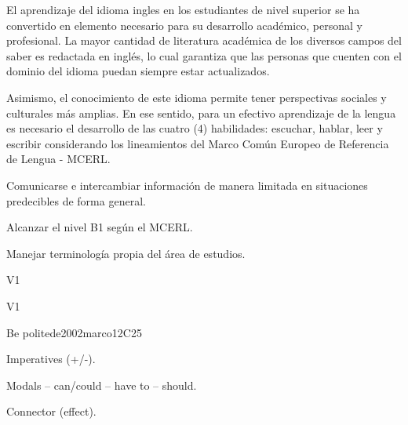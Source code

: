 \begin{syllabus}


\begin{justification}
El aprendizaje del idioma ingles en los estudiantes de nivel superior se ha 
convertido en elemento necesario para su desarrollo académico, 
personal y profesional. La mayor cantidad de literatura académica de los 
diversos campos del saber es redactada en inglés, lo cual garantiza que las 
personas que cuenten con el dominio del idioma puedan siempre estar actualizados. 

Asimismo, el conocimiento de este idioma permite tener perspectivas 
sociales y culturales más amplias. En ese sentido, para un efectivo aprendizaje 
de la lengua es necesario el desarrollo de las cuatro (4) habilidades: 
escuchar, hablar, leer y escribir considerando los lineamientos del 
Marco Común Europeo de Referencia de Lengua - MCERL.
\end{justification}

\begin{goals}
\item Comunicarse e intercambiar información de manera limitada en situaciones predecibles de forma general.
\item Alcanzar el nivel B1 según el MCERL.
\item Manejar terminología propia del área de estudios.
\end{goals}

\begin{outcomes}{V1}
\item {}
\end{outcomes}

\begin{competences}{V1}
\item {}
\end{competences}

\begin{unit}{Be polite}{}{de2002marco}{12}{C25}
   \begin{topics}
      \item Imperatives (+/-).
      \item Modals – can/could – have to – should.
      \item Connector (effect).
   \end{topics}


\end{unit}
\end{syllabus}
